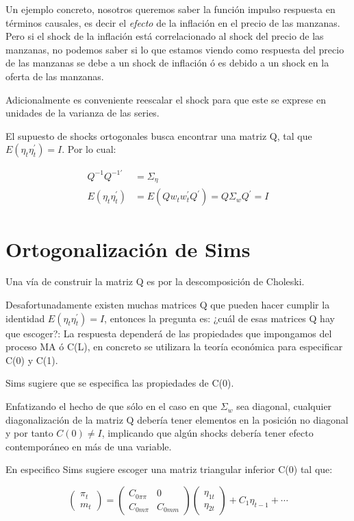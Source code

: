 \documentclass[
]{book}
\begin{document}
Un ejemplo concreto, nosotros queremos saber la función impulso respuesta en términos causales, es decir el \emph{efecto} de la inflación en el precio de las manzanas. Pero si el shock de la inflación está correlacionado al shock del precio de las manzanas, no podemos saber si lo que estamos viendo como respuesta del precio de las manzanas se debe a un shock de inflación ó es debido a un shock en la oferta de las manzanas.

Adicionalmente es conveniente reescalar el shock para que este se exprese en unidades de la varianza de las series.

El supuesto de shocks ortogonales busca encontrar una matriz Q, tal que \(E(\eta_{t}\eta_{t}^{'})=I\). Por lo cual:

\begin{align}
Q^{-1}Q^{-1'}&=\Sigma_{\eta} \\
E(\eta_{t}\eta_{t}^{'})&=E(Qw_{t}w_{t}^{'}Q^{'})=Q\Sigma_{w} Q^{'}=I\nonumber
\end{align}

\hypertarget{ortogonalizaciuxf3n-de-sims}{%
\section{Ortogonalización de Sims}\label{ortogonalizaciuxf3n-de-sims}}

Una vía de construir la matriz Q es por la descomposición de Choleski.

Desafortunadamente existen muchas matrices Q que pueden hacer cumplir la identidad \(E(\eta_{t}\eta_{t}^{'})=I\), entonces la pregunta es: ¿cuál de esas matrices Q hay que escoger?: La respuesta dependerá de las propiedades que impongamos del proceso MA ó C(L), en concreto se utilizara la teoría económica para especificar C(0) y C(1).

Sims sugiere que se especifica las propiedades de C(0).

Enfatizando el hecho de que sólo en el caso en que \(\Sigma_{w}\) sea diagonal, cualquier diagonalización de la matriz Q debería tener elementos en la posición no diagonal y por tanto \(C(0)\neq I\), implicando que algún shocks debería tener efecto contemporáneo en más de una variable.

En especifico Sims sugiere escoger una matriz triangular inferior C(0) tal que:

\begin{equation}
    \left( \begin{array}{c}
    \pi_{t} \\
      m_{t} 
    \end{array}\right)=\left( \begin{array}{cc}
    C_{0\pi \pi} & 0\\
    C_{0m  \pi} & C_{0mm}
    \end{array}
    \right) \left( \begin{array}{c}
    \eta_{1t}\\
    \eta_{2t}
    \end{array}
    \right) +C_{1}\eta_{t-1}+\cdots
\end{equation}
\end{document}
